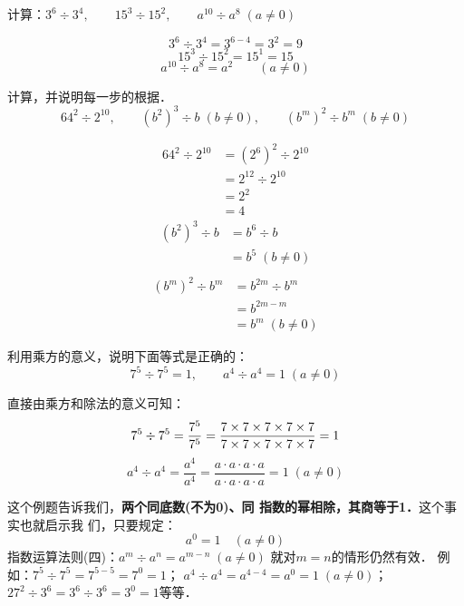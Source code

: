 \begin{example}
	计算：$3^6\div 3^4,\qquad 15^3\div 15^2,\qquad a^{10}\div a^8 \; (a\ne 0)$
\end{example}

\begin{solution}
	\[3^6\div 3^4=3^{6-4}=3^2=9 \]
	\[15^3\div 15^2=15^1=15\]
	\[a^{10}\div a^8=a^2\qquad (a\ne 0)\]
\end{solution}

\begin{example}
	计算，并说明每一步的根据．
	\[64^2\div 2^{10},\qquad (b^2)^3\div b\; (b\ne 0),\qquad (b^m)^2\div b^m\; (b\ne 0) \]
\end{example}

\begin{solution}
	\begin{align*}
	64^2\div 2^{10}&=(2^6)^2\div 2^{10} \tag{乘方的意义}\\
	&=2^{12}\div 2^{10} \tag{指数运算律（三）}\\
	&=2^2 \tag{指数运算律（四）}\\
	&=4\tag{乘方的意义}
	\end{align*}    
	\begin{align*}
	(b^2)^3\div b &=b^6\div b \tag{指数运算律（三）}\\
	&=b^5 \; (b\ne 0)\tag{指数运算律（四）}\\
	\end{align*} 
	\begin{align*}
	(b^m)^2\div b^m  &=b^{2m}\div b^m \tag{指数运算律（三）}\\
	&=b^{2m-m}\tag{指数运算律（四）}\\
	&=b^m \; (b\ne 0)
	\end{align*} 
\end{solution}

\begin{example}
	利用乘方的意义，说明下面等式是正确的：
	\[7^5\div 7^5=1,\qquad a^4\div a^4=1\; (a\ne 0) \]
\end{example}

\begin{solution}
	直接由乘方和除法的意义可知：
	\[ 7^5\div 7^5=\dfrac{7^5}{7^5}=\dfrac{7\times7\times7\times7\times7}{7\times7\times7\times7\times7}=1 \]
	\[a^4\div a^4=\frac{a^4}{a^4}=\frac{a\cdot a\cdot a\cdot a}{a\cdot a\cdot a\cdot a}=1\; (a\ne 0)\]
\end{solution}

这个例题告诉我们，\textbf{两个同底数(不为0)、同
	指数的幂相除，其商等于1．}这个事实也就启示我
们，只要规定：
\[a^0=1\quad (a\ne 0) \]
指数运算法则(四)：$a^m\div a^n=a^{m-n}\; (a\ne 0)$
就对$m=n$的情形仍然有效．
例如：$7^5\div 7^5=7^{5-5}=7^0=1$；
$a^4\div a^4=a^{4-4}=a^0=1\; (a\ne 0)$；$27^2\div 3^6=3^6\div 3^6=3^0=1$等等．

